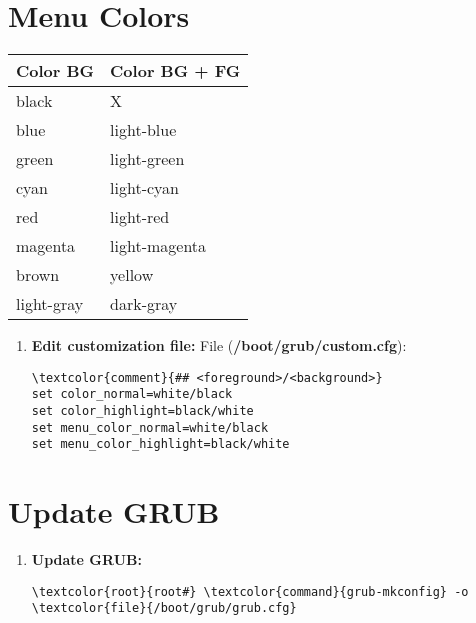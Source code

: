 \documentclass[10pt, a4paper, onecolumn, openany]{book} %
\begin{document}
\section{Menu Colors}
\begin{center}
    \begin{small}
    \begin{tabular}{|p{4cm}|p{4cm}|}
    \hline
    \textbf{Color BG} & \textbf{Color BG + FG} \\
    \hline
    black & X \\
    \hline
    blue & light-blue \\
    \hline
    green & light-green \\
    \hline
    cyan & light-cyan \\
    \hline
    red & light-red \\
    \hline
    magenta & light-magenta \\
    \hline
    brown & yellow \\
    \hline
    light-gray & dark-gray  \\
    \hline
    \end{tabular}
    \end{small}
\end{center}
\begin{enumerate}
    \item \textbf{Edit customization file:}
\newline File (\textbf{\textcolor{file}{/boot/grub/custom.cfg}}):
\begin{Verbatim}[commandchars=\\\{\}]
\textcolor{comment}{## <foreground>/<background>}
set color_normal=white/black
set color_highlight=black/white
set menu_color_normal=white/black
set menu_color_highlight=black/white
\end{Verbatim}
\end{enumerate}
\section{Update GRUB}
\label{GRUB}
\begin{enumerate}
    \item \textbf{Update GRUB:}
\begin{Verbatim}[commandchars=\\\{\}]
\textcolor{root}{root#} \textcolor{command}{grub-mkconfig} -o \textcolor{file}{/boot/grub/grub.cfg}
\end{Verbatim}
\end{enumerate}
\end{document}
